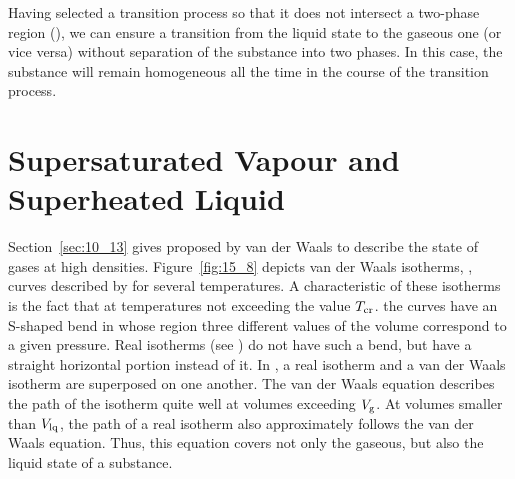 Having selected a transition process so that it does not intersect a two-phase region (), we can ensure a transition from the liquid state to the gaseous one (or vice versa) without separation of the substance into two phases. In this case, the substance will remain homogeneous all the time in the course of the transition process.

\section{Supersaturated Vapour and Superheated Liquid}\label{sec:15_5}

Section~\ref{sec:10_13} gives  proposed by van der Waals to describe the state of gases at high densities. Figure~\ref{fig:15_8} depicts van der Waals isotherms, \ie, curves described by  for several temperatures. A characteristic of these isotherms is the fact that at temperatures not exceeding the value $T_{\text{cr}}$. the curves have an S-shaped bend in whose region three different values of the volume correspond to a given pressure. Real isotherms (see ) do not have such a bend, but have a straight horizontal portion instead of it. In , a real isotherm and a van der Waals isotherm are superposed on one another. The van der Waals equation describes the path of the isotherm quite well at volumes exceeding $V_{\text{g}}$. At volumes smaller than $V_{\text{lq}}$, the path of a real isotherm also approximately follows the van der Waals equation. Thus, this equation covers not only the gaseous, but also the liquid state of a substance.

